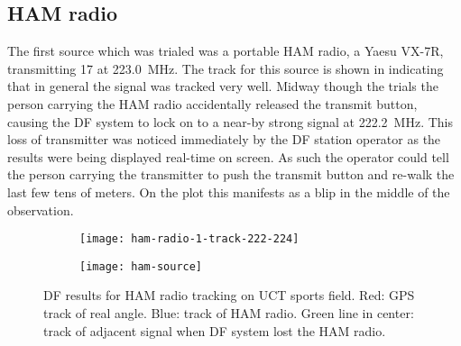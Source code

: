 \subsection{HAM radio}
The first source which was trialed was a portable HAM radio, a Yaesu VX-7R, transmitting \SI{17}{\dBm} at \SI{223.0}{\mega\hertz}. The track for this source is shown in  indicating that in general the signal was tracked very well. Midway though the trials the person carrying the HAM radio accidentally released the transmit button, causing the DF system to lock on to a near-by strong signal at \SI{222.2}{\mega\hertz}. This loss of transmitter was noticed immediately by the DF station operator as the results were being displayed real-time on screen. As such the operator could tell the person carrying the transmitter to push the transmit button and re-walk the last few tens of meters. On the plot this manifests as a blip in the middle of the observation.

\begin{figure}
  \centering
  \begin{subfigure}[b]{0.77\textwidth}
    \centering
    \texttt{[image: ham-radio-1-track-222-224]}
  \end{subfigure}
  \begin{subfigure}[b]{0.22\textwidth}
    \centering
    \texttt{[image: ham-source]}
  \end{subfigure}
  \caption{DF results for HAM radio tracking on UCT sports field. Red: GPS track of real angle. Blue: track of HAM radio. Green line in center: track of adjacent signal when DF system lost the HAM radio.}
  \label{fig:field-trials:ham-source}
\end{figure}

